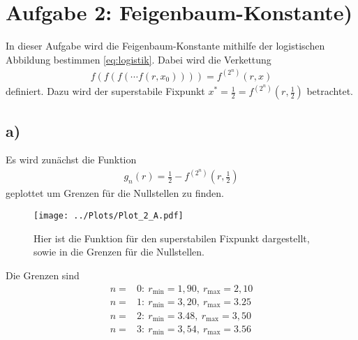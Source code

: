 
\section*{Aufgabe 2: Feigenbaum-Konstante)}
 In dieser Aufgabe wird die Feigenbaum-Konstante mithilfe der logistischen Abbildung bestimmen \cref{eq:logistik}.
 Dabei wird die Verkettung
 \begin{align*}
	f(f(f(\cdots f(r,x_0))))=f^{(2^n)}(r,x)
 \end{align*}
 definiert.
 Dazu wird der superstabile Fixpunkt $x^*=\frac{1}{2}=f^{(2^n)}(r,\frac{1}{2})$ betrachtet.
\subsection*{a)}
	Es wird zunächst die Funktion 
	\begin{align*}
		g_n(r)=\frac{1}{2}-f^{(2^n)}(r,\frac{1}{2})
	\end{align*}
	geplottet um Grenzen für die Nullstellen zu finden.
	\begin{figure}[h!]
		\centering
		\texttt{[image: ../Plots/Plot\_2\_A.pdf]}
		\caption{Hier ist die Funktion für den superstabilen Fixpunkt dargestellt, sowie in die Grenzen für die Nullstellen.}
	\end{figure}
Die Grenzen sind
\begin{align*}
	n=&0:\ r_\text{min}=1,90,\ r_\text{max}=2,10\\
	n=&1:\ r_\text{min}=3,20,\ r_\text{max}=3.25\\
	n=&2:\ r_\text{min}=3.48,\ r_\text{max}=3,50\\
	n=&3:\ r_\text{min}=3,54,\ r_\text{max}=3.56
\end{align*}
